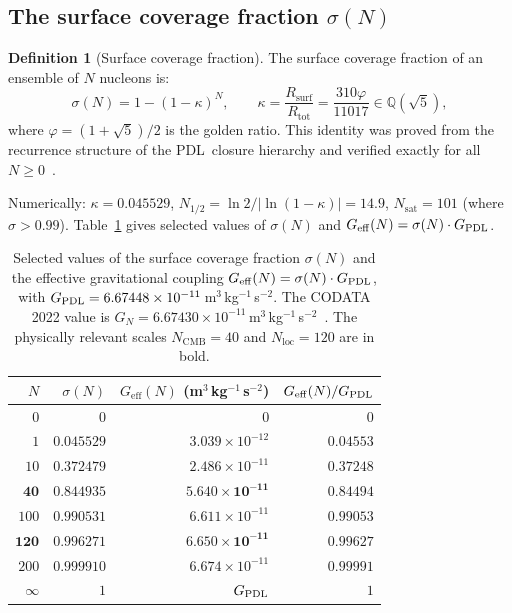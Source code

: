 \documentclass[11pt,a4paper]{article}
\theoremstyle{definition}
\newtheorem{definition}[theorem]{Definition}
\newcommand{\PDL}{\textnormal{PDL}}
\newcommand{\Rsurf}{R_{\mathrm{surf}}}
\newcommand{\Rtot}{R_{\mathrm{tot}}}
\newcommand{\vp}{\varphi}
\newcommand{\GPDL}{G_{\PDL}}
\newcommand{\Geff}{G_{\mathrm{eff}}}
\newcommand{\sig}{\sigma}
\newcommand{\kap}{\kappa}
\begin{document}
\subsection{The surface coverage fraction \texorpdfstring{$\sig(N)$}{sig(N)}}

\begin{definition}[Surface coverage fraction]
\label{def:sigma}
The surface coverage fraction of an ensemble of $N$ nucleons is:
\begin{equation}
\sig(N) = 1 - (1-\kap)^N, \qquad \kap = \frac{\Rsurf}{\Rtot} = \frac{310\vp}{11017} \in \mathbb{Q}(\sqrt{5}),
\label{eq:sigma}
\end{equation}
where $\vp = (1+\sqrt{5})/2$ is the golden ratio. This identity was proved from the recurrence structure of the \PDL\ closure hierarchy and verified exactly for all $N \geq 0$~\cite{Effective_Sigma_PDL_2026}.
\end{definition}

Numerically: $\kap = 0.045529$, $N_{1/2} = \ln 2/|\ln(1-\kap)| = 14.9$, $N_{\mathrm{sat}} = 101$ (where $\sig > 0.99$). Table~\ref{tab:sigma} gives selected values of $\sig(N)$ and $\Geff(N) = \sig(N)\cdot\GPDL$.

\begin{table}[ht]
\centering
\caption{Selected values of the surface coverage fraction $\sig(N)$ and the effective gravitational coupling $\Geff(N) = \sig(N)\cdot\GPDL$, with $\GPDL = 6.67448\times10^{-11}$\,m$^3$\,kg$^{-1}$\,s$^{-2}$. The CODATA 2022 value is $G_N = 6.67430\times10^{-11}$\,m$^3$\,kg$^{-1}$\,s$^{-2}$~\cite{CODATA2022}. The physically relevant scales $N_{\mathrm{CMB}} = 40$ and $N_{\mathrm{loc}} = 120$ are in bold.}
\label{tab:sigma}
\begin{tabular}{rrrr}
\toprule
$N$ & $\sig(N)$ & $\Geff(N)$ (m$^3$\,kg$^{-1}$\,s$^{-2}$) & $\Geff(N)/\GPDL$ \\
\midrule
$0$ & $0$ & $0$ & $0$ \\
$1$ & $0.045529$ & $3.039\times10^{-12}$ & $0.04553$ \\
$10$ & $0.372479$ & $2.486\times10^{-11}$ & $0.37248$ \\
$\mathbf{40}$ & $\mathbf{0.844935}$ & $\mathbf{5.640\times10^{-11}}$ & $\mathbf{0.84494}$ \\
$100$ & $0.990531$ & $6.611\times10^{-11}$ & $0.99053$ \\
$\mathbf{120}$ & $\mathbf{0.996271}$ & $\mathbf{6.650\times10^{-11}}$ & $\mathbf{0.99627}$ \\
$200$ & $0.999910$ & $6.674\times10^{-11}$ & $0.99991$ \\
$\infty$ & $1$ & $\GPDL$ & $1$ \\
\bottomrule
\end{tabular}
\end{table}
\end{document}
